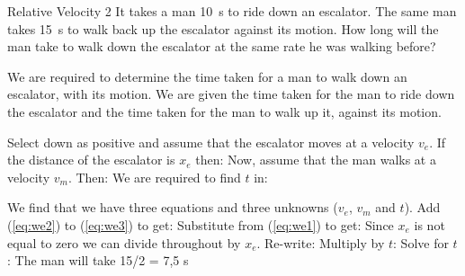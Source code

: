 \begin{wex}
{Relative Velocity 2}
{It takes a man 10~s to ride down an escalator. The same man
  takes 15~s to walk back up the escalator against its motion. How
  long will the man take to walk down the escalator at the same rate
  he was walking before?}
{
We are required to determine the time taken for a man to walk down an escalator, with its motion.
We are given the time taken for the man to ride down the escalator and the time taken for the man to walk up it, against its motion.

Select down as positive and assume that the escalator moves at a velocity $v_e$. If the distance of the escalator is $x_e$ then:
Now, assume that the man walks at a velocity $v_m$. Then:
We are required to find $t$ in:

We find that we have three equations and three unknowns ($v_e$, $v_m$ and $t$).
Add (\ref{eq:we2}) to (\ref{eq:we3}) to get:
Substitute from (\ref{eq:we1}) to get:
Since $x_e$ is not equal to zero we can divide throughout by $x_e$.
Re-write:
Multiply by $t$:
Solve for $t$:
The man will take 15/2 = 7,5 s
}
\end{wex}


